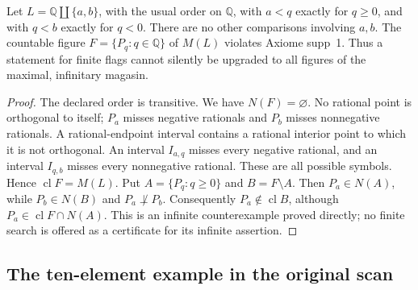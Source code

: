 \begin{counterexample}
\label{SA21-A10}
Let $L=\mathbb Q\amalg\{a,b\}$, with the usual order on $\mathbb Q$,
with $a<q$ exactly for $q\geq0$, and with $q<b$ exactly for $q<0$.
There are no other comparisons involving $a,b$.
The countable figure $F=\{P_q:q\in\mathbb Q\}$ of $M(L)$ violates
Axiome supp~1. Thus a statement for finite flags cannot silently be
upgraded to all figures of the maximal, infinitary magasin.
\end{counterexample}
\begin{proof}
The declared order is transitive. We have $N(F)=\varnothing$.
No rational point is orthogonal to itself; $P_a$ misses negative
rationals and $P_b$ misses nonnegative rationals. A rational-endpoint
interval contains a rational interior point to which it is not
orthogonal. An interval $I_{a,q}$ misses every negative rational,
and an interval $I_{q,b}$ misses every nonnegative rational. These
are all possible symbols. Hence $\operatorname{cl}F=M(L)$.
Put $A=\{P_q:q\geq0\}$ and $B=F\setminus A$.
Then $P_a\in N(A)$, while $P_b\in N(B)$ and $P_a\not\perp P_b$.
Consequently $P_a\notin\operatorname{cl}B$, although
$P_a\in\operatorname{cl}F\cap N(A)$.
This is an infinite counterexample proved directly; no finite search
is offered as a certificate for its infinite assertion.
\end{proof}

\subsection{The ten-element example in the original scan}

